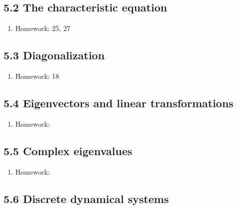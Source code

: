 \documentclass{article}
\begin{document}
\subsection{5.2 The characteristic equation}

\begin{enumerate}

\item Homework: 25, 27

\end{enumerate}

\subsection{5.3 Diagonalization}

\begin{enumerate}

\item Homework: 18

\end{enumerate}

\subsection{5.4 Eigenvectors and linear transformations}

\begin{enumerate}

\item Homework: 

\end{enumerate}

\subsection{5.5 Complex eigenvalues}

\begin{enumerate}

\item Homework: 

\end{enumerate}

\subsection{5.6 Discrete dynamical systems}
\end{document}
